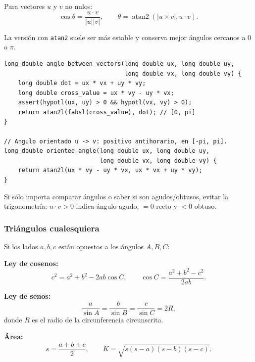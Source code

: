Para vectores $u$ y $v$ no nulos:
\[
\cos\theta=\frac{u\cdot v}{|u||v|},\qquad
\theta=\operatorname{atan2}(|u\times v|,u\cdot v).
\]

La versi\'on con \texttt{atan2} suele ser m\'as estable y conserva mejor
\'angulos cercanos a $0$ o $\pi$.

\begin{lstlisting}[style=cpp]
long double angle_between_vectors(long double ux, long double uy,
                                  long double vx, long double vy) {
    long double dot = ux * vx + uy * vy;
    long double cross_value = ux * vy - uy * vx;
    assert(hypotl(ux, uy) > 0 && hypotl(vx, vy) > 0);
    return atan2l(fabsl(cross_value), dot); // [0, pi]
}

// Angulo orientado u -> v: positivo antihorario, en [-pi, pi].
long double oriented_angle(long double ux, long double uy,
                           long double vx, long double vy) {
    return atan2l(ux * vy - uy * vx, ux * vx + uy * vy);
}
\end{lstlisting}

Si s\'olo importa comparar \'angulos o saber si son agudos/obtusos, evitar la
trigonometr\'ia: $u\cdot v>0$ indica \'angulo agudo, $=0$ recto y $<0$ obtuso.

\subsubsection{Tri\'angulos cualesquiera}

Si los lados $a,b,c$ est\'an opuestos a los \'angulos $A,B,C$:

\textbf{Ley de cosenos:}
\[
c^2=a^2+b^2-2ab\cos C,\qquad
\cos C=\frac{a^2+b^2-c^2}{2ab}.
\]

\textbf{Ley de senos:}
\[
\frac{a}{\sin A}=\frac{b}{\sin B}=\frac{c}{\sin C}=2R,
\]
donde $R$ es el radio de la circunferencia circunscrita.

\textbf{\'Area:}
\[
s=\frac{a+b+c}{2},\qquad
K=\sqrt{s(s-a)(s-b)(s-c)}.
\]

